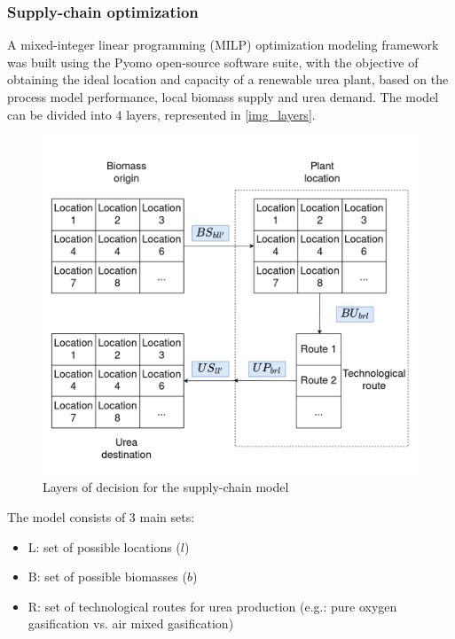 \documentclass[a4paper, titlepage]{article}
\begin{document}
\subsubsection{Supply-chain optimization}

A mixed-integer linear programming (MILP) optimization modeling framework was built using the Pyomo open-source
software suite, with the objective of obtaining the ideal location and capacity of a renewable urea plant,
based on the process model performance, local biomass supply and urea demand. The model can be divided into 4 layers,
represented in \autoref{img_layers}.

\begin{figure}[htb]
    \includegraphics[width=\textwidth]{img/layers_of_decision.png}
    \caption{Layers of decision for the supply-chain model}
    \label{img_layers}
\end{figure}

The model consists of 3 main sets:

\begin{itemize}
    \item L: set of possible locations ($l$)
    \item B: set of possible biomasses ($b$)
    \item R: set of technological routes for urea production (e.g.: pure oxygen gasification vs. air mixed gasification)
\end{itemize}
\end{document}
